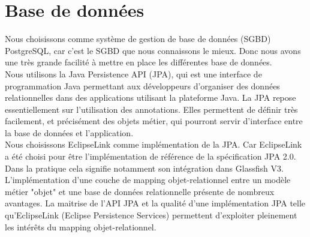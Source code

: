 \section{Base de données}

Nous choisissons comme système de gestion de base de données (SGBD) PostgreSQL, car c'est le SGBD que nous connaissons le mieux. Donc nous avons une très grande facilité à mettre en place les différentes base de données.\\

Nous utilisons la  Java Persistence API (JPA), qui est une interface de programmation Java permettant aux développeurs d'organiser des données relationnelles dans des applications utilisant la plateforme Java.
La JPA repose essentiellement sur l'utilisation des annotations. Elles permettent de définir très facilement, et précisément des objets métier, qui pourront servir d'interface entre la base de données et l'application.\\

Nous choisissons EclipseLink comme implémentation de la JPA. Car EclipseLink  a été choisi pour être l'implémentation de référence de la spécification JPA 2.0. Dans la pratique cela signifie notamment son intégration dans Glassfish V3. L'implémentation d'une couche de mapping objet-relationnel entre un modèle métier "objet" et une base de données relationnelle présente de nombreux avantages. La maitrise de l'API JPA et la qualité d'une implémentation JPA telle qu'EclipseLink (Eclipse Persistence Services) permettent d'exploiter pleinement les intérêts du mapping objet-relationnel.\\


